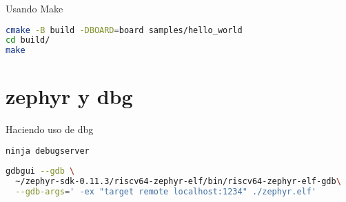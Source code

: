 \documentclass{beamer}
\begin{document}
\begin{frame}[fragile]{Usando Make}
\begin{lstlisting}[language=Bash, tabsize=2, label=code_, basicstyle=\small]
cmake -B build -DBOARD=board samples/hello_world
cd build/
make
\end{lstlisting}
\end{frame}

\section{zephyr y dbg}

\begin{frame}[fragile]{Haciendo uso de dbg}
\begin{lstlisting}[language=Bash, tabsize=2, label=code_, basicstyle=\small]
ninja debugserver
\end{lstlisting}

\begin{lstlisting}[upquote=true, language=Bash, tabsize=2, label=code_, basicstyle=\small, columns=fullflexible, showspaces=false, showstringspaces=false]
gdbgui --gdb \
  ~/zephyr-sdk-0.11.3/riscv64-zephyr-elf/bin/riscv64-zephyr-elf-gdb\
  --gdb-args=' -ex "target remote localhost:1234" ./zephyr.elf'
\end{lstlisting}

\end{frame}
\end{document}
